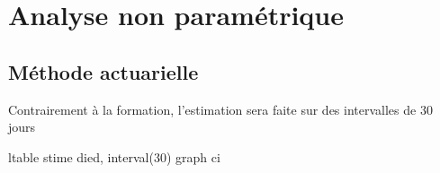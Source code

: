 \documentclass[
  12pt,
  letterpaper,
  DIV=11,
  numbers=noendperiod,
  onepage,
  openany]{scrreprt}
\newenvironment{Shaded}{\begin{snugshade}}{\end{snugshade}}
\newcommand{\KeywordTok}[1]{\textcolor[rgb]{0.94,0.87,0.69}{#1}}
\newcommand{\NormalTok}[1]{\textcolor[rgb]{0.80,0.80,0.80}{#1}}
\begin{document}
\hypertarget{analyse-non-paramuxe9trique-1}{%
\section{Analyse non paramétrique}\label{analyse-non-paramuxe9trique-1}}

\hypertarget{muxe9thode-actuarielle-1}{%
\subsection{Méthode actuarielle}\label{muxe9thode-actuarielle-1}}

Contrairement à la formation, l'estimation sera faite sur des
intervalles de 30 jours

\begin{Shaded}
\begin{Highlighting}[]
\KeywordTok{ltable}\NormalTok{ stime died, interval(30) }\KeywordTok{graph} \KeywordTok{ci}
\end{Highlighting}
\end{Shaded}
\end{document}
